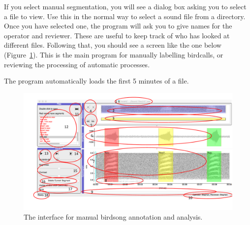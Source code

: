 \documentclass{article}
\begin{document}
If you select manual segmentation, you will see a dialog box asking you to select a file to view. Use this in the normal way to select a sound file from a directory. Once you have selected one, the program will ask you to give names for the operator and reviewer. These are useful to keep track of who has looked at different files. Following that, you should see a screen like the one below (Figure~\ref{main}). This is the main program for manually labelling birdcalls, or reviewing the processing of automatic processes.

The program automatically loads the first 5 minutes of a file. 

\begin{figure}[h!]
\centering
\includegraphics[width=.8\textwidth]{Figs/avianzinterface.pdf}
\caption{The interface for manual birdsong annotation and analysis.}
\label{main}
\end{figure}
\end{document}
